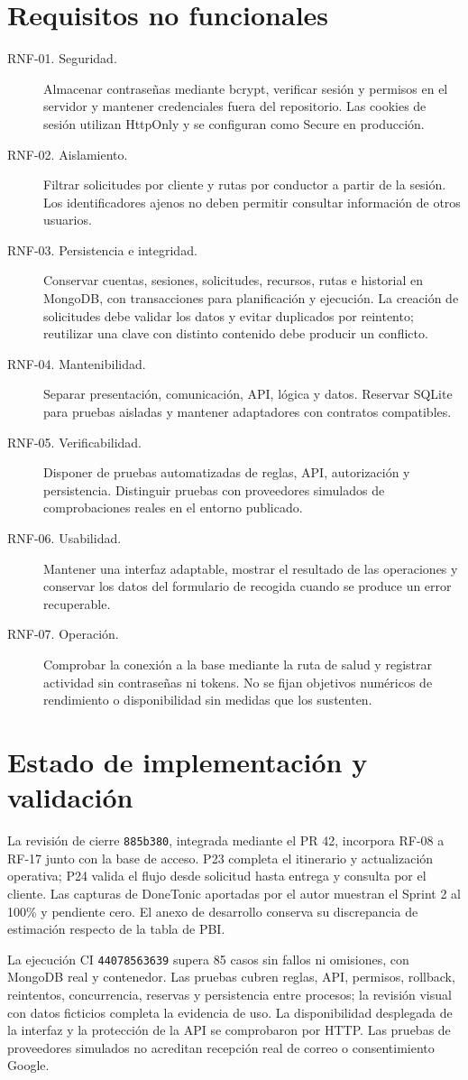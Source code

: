 \section{Requisitos no funcionales}
\begin{description}
\item[RNF-01. Seguridad.] Almacenar contraseñas mediante bcrypt, verificar sesión y permisos en el servidor y mantener credenciales fuera del repositorio. Las cookies de sesión utilizan HttpOnly y se configuran como Secure en producción.
\item[RNF-02. Aislamiento.] Filtrar solicitudes por cliente y rutas por conductor a partir de la sesión. Los identificadores ajenos no deben permitir consultar información de otros usuarios.
\item[RNF-03. Persistencia e integridad.] Conservar cuentas, sesiones, solicitudes, recursos, rutas e historial en MongoDB, con transacciones para planificación y ejecución. La creación de solicitudes debe validar los datos y evitar duplicados por reintento; reutilizar una clave con distinto contenido debe producir un conflicto.
\item[RNF-04. Mantenibilidad.] Separar presentación, comunicación, API, lógica y datos. Reservar SQLite para pruebas aisladas y mantener adaptadores con contratos compatibles.
\item[RNF-05. Verificabilidad.] Disponer de pruebas automatizadas de reglas, API, autorización y persistencia. Distinguir pruebas con proveedores simulados de comprobaciones reales en el entorno publicado.
\item[RNF-06. Usabilidad.] Mantener una interfaz adaptable, mostrar el resultado de las operaciones y conservar los datos del formulario de recogida cuando se produce un error recuperable.
\item[RNF-07. Operación.] Comprobar la conexión a la base mediante la ruta de salud y registrar actividad sin contraseñas ni tokens. No se fijan objetivos numéricos de rendimiento o disponibilidad sin medidas que los sustenten.
\end{description}

\section{Estado de implementación y validación}
La revisión de cierre \texttt{885b380}, integrada mediante el PR 42, incorpora RF-08 a RF-17 junto con la base de acceso. P23 completa el itinerario y actualización operativa; P24 valida el flujo desde solicitud hasta entrega y consulta por el cliente. Las capturas de DoneTonic aportadas por el autor muestran el Sprint 2 al 100\% y pendiente cero. El anexo de desarrollo conserva su discrepancia de estimación respecto de la tabla de PBI.

La ejecución CI \texttt{44078563639} supera 85 casos sin fallos ni omisiones, con MongoDB real y contenedor. Las pruebas cubren reglas, API, permisos, rollback, reintentos, concurrencia, reservas y persistencia entre procesos; la revisión visual con datos ficticios completa la evidencia de uso. La disponibilidad desplegada de la interfaz y la protección de la API se comprobaron por HTTP. Las pruebas de proveedores simulados no acreditan recepción real de correo o consentimiento Google.
